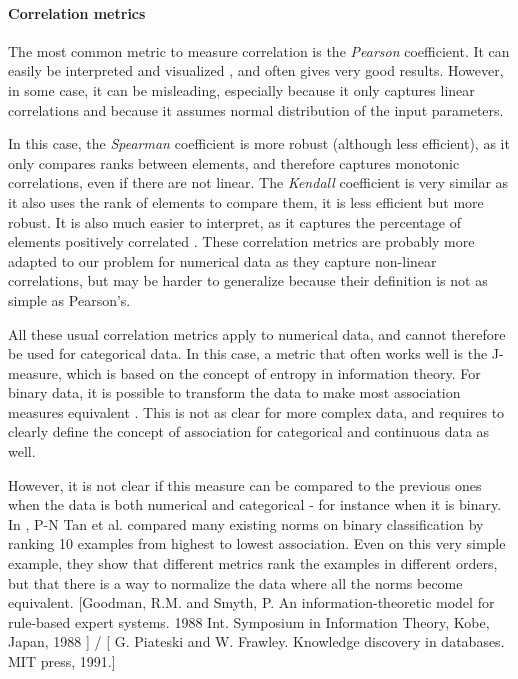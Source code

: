 \documentclass[12pt,a4paper]{article}
\begin{document}
\paragraph{Correlation metrics}
The most common metric to measure correlation is the \emph{Pearson} coefficient. It can easily be interpreted and visualized \cite{pearson}, and often gives very good results. However, in some case, it can be misleading, especially because it only captures linear correlations and because it assumes normal distribution of the input parameters.

In this case, the \emph{Spearman} coefficient is more robust (although less efficient), as it only compares ranks between elements, and therefore captures monotonic correlations, even if there are not linear. The \emph{Kendall} coefficient is very similar as it also uses the rank of elements to compare them, it is less efficient but more robust. It is also much easier to interpret, as it captures the percentage of elements positively correlated \cite{spearman-kendall, spearman-kendall2}. These correlation metrics are probably more adapted to our problem for numerical data as they capture non-linear correlations, but may be harder to generalize because their definition is not as simple as Pearson's.

All these usual correlation metrics apply to numerical data, and cannot therefore be used for categorical data. In this case, a metric that often works well is the J-measure, which is based on the concept of entropy in information theory. For binary data, it is possible to transform the data to make most association measures equivalent \cite{metric-comparison}. This is not as clear for more complex data, and requires to clearly define the concept of association for categorical and continuous data as well.

However, it is not clear if this measure can be compared to the previous ones when the data is both numerical and categorical - for instance when it is binary. In \cite{metric-comparison}, P-N Tan et al. compared many existing norms on binary classification by ranking 10 examples from highest to lowest association. Even on this very simple example, they show that different metrics rank the examples in different orders, but that there is a way to normalize the data where all the norms become equivalent.
[Goodman, R.M. and Smyth, P. An information-theoretic model for rule-based expert systems. 1988 Int. Symposium in Information Theory, Kobe, Japan, 1988
] / [ G. Piateski and W. Frawley. Knowledge discovery in databases. MIT press, 1991.]
\end{document}
